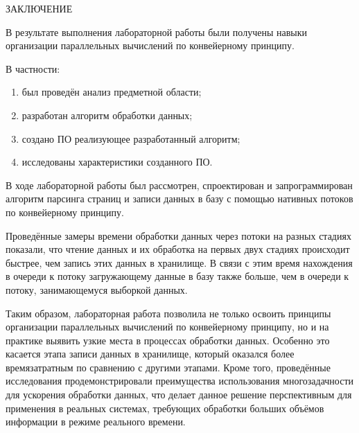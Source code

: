 \begin{center}
    \MakeUppercase{\large Заключение}
\end{center}

В результате выполнения лабораторной работы были получены навыки организации параллельных вычислений по конвейерному принципу.

\vspace{0.25cm}
В частности:

\begin{enumerate}[label=\arabic*)]

\item был проведён анализ предметной области;

\item разработан алгоритм обработки данных;

\item создано ПО реализующее разработанный алгоритм;

\item исследованы характеристики созданного ПО.

\end{enumerate}

В ходе лабораторной работы был рассмотрен, спроектирован и запрограммирован алгоритм парсинга страниц и записи данных в базу с помощью нативных потоков по конвейерному принципу.

Проведённые замеры времени обработки данных через потоки на разных стадиях показали, что чтение данных и их обработка на первых двух стадиях происходит быстрее, чем запись этих данных в хранилище. В связи с этим время нахождения в очереди к потоку загружающему данные в базу также больше, чем в очереди к потоку, занимающемуся выборкой данных.

Таким образом, лабораторная работа позволила не только освоить принципы организации параллельных вычислений по конвейерному принципу, но и на практике выявить узкие места в процессах обработки данных. Особенно это касается этапа записи данных в хранилище, который оказался более времязатратным по сравнению с другими этапами. Кроме того, проведённые исследования продемонстрировали преимущества использования многозадачности для ускорения обработки данных, что делает данное решение перспективным для применения в реальных системах, требующих обработки больших объёмов информации в режиме реального времени.

\newpage